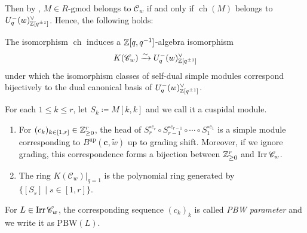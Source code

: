 Then by \cite{GLSqua}, $M \in R\text{-}\mathrm{gmod}$
belongs to $\mathscr{C}_w$ if and only if $\operatorname{ch}(M)$
belongs to $U_q^-(w)_{\mathbb{Z}[q^{\pm 1}]}^\vee$.
Hence, the following holds:

\begin{Prop}
\label{Prop : Cw categorification}
The isomorphism $\operatorname{ch}$ induces
a $\mathbb{Z}[q, q^{-1}]$-algebra isomorphism
\[
K(\mathscr{C}_w) \xrightarrow{\sim} U_q^-(w)_{\mathbb{Z}[q^{\pm 1}]}^\vee
\]
under which the isomorphism classes of self-dual simple modules
correspond bijectively to the dual canonical basis
of $U_q^-(w)_{\mathbb{Z}[q^{\pm 1}]}^\vee$.
\end{Prop}

For each $1 \leq k \leq r$, let $S_k \coloneq M[k, k]$
and we call it a cuspidal module.

\begin{Prop}
\label{Prop : KLR PBW parameterization}
\begin{enumerate}
\item [(i)]
For $(c_k)_{k \in [1, r]} \in \mathbb{Z}_{\geq 0}^r$,
the head of $S_r^{\circ c_r} \circ S_{r - 1}^{\circ c_{r - 1}}
\circ \cdots \circ S_1^{\circ c_1}$
is a simple module corresponding to
$B^{\mathrm{up}}(\mathbf{c}, \widetilde{w})$ up to grading shift.
Moreover, if we ignore grading, this correspondence forms
a bijection between $\mathbb{Z}_{\geq 0}^r$ and $\mathop{\mathrm{Irr}}\nolimits\mathscr{C}_w$.
\item[(ii)] The ring
    $K(\mathscr{C}_w)|_{q=1}$ is the polynomial ring
    generated by $\{[S_s] \mid s \in [1, r]\}$. 
    \end{enumerate}
\end{Prop}

For $L \in \mathop{\mathrm{Irr}}\nolimits\mathscr{C}_w$, the corresponding sequence $(c_k)_k$
is called \emph{PBW parameter} and we write it as $\mathrm{PBW}(L)$.
